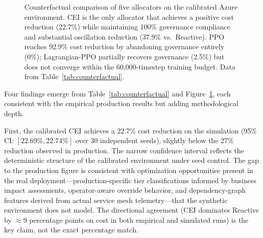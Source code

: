 \documentclass[runningheads]{llncs}
\begin{document}
\begin{figure}[ht]
\centering
{}
\caption{Counterfactual comparison of five allocators on the calibrated Azure environment. CEI is the only allocator that achieves a positive cost reduction (22.7\%) while maintaining 100\% governance compliance and substantial oscillation reduction (37.9\% vs.\ Reactive). PPO reaches 92.9\% cost reduction by abandoning governance entirely (0\%); Lagrangian-PPO partially recovers governance (2.5\%) but does not converge within the 60{,}000-timestep training budget. Data from Table~\ref{tab:counterfactual}.}
\label{fig:counterfactual}
\end{figure}

Four findings emerge from Table~\ref{tab:counterfactual} and Figure~\ref{fig:counterfactual}, each consistent with the empirical production results but adding methodological depth.

First, the calibrated CEI achieves a 22.7\% cost reduction on the simulation (95\% CI: $[22.69\%, 22.74\%]$ over 30 independent seeds), slightly below the 27\% reduction observed in production. The narrow confidence interval reflects the deterministic structure of the calibrated environment under seed control. The gap to the production figure is consistent with optimization opportunities present in the real deployment---production-specific tier classifications informed by business impact assessments, operator-aware override behavior, and dependency-graph features derived from actual service mesh telemetry---that the synthetic environment does not model. The directional agreement (CEI dominates Reactive by $\approx$9 percentage points on cost in both empirical and simulated runs) is the key claim, not the exact percentage match.
\end{document}
